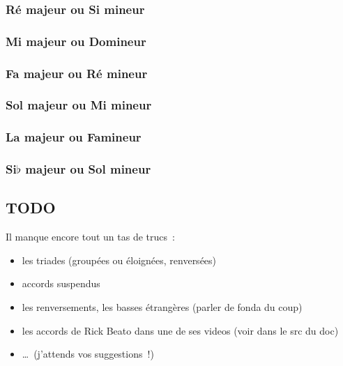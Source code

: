 \documentclass[11pt]{article}
\begin{document}
\subsubsection{Ré majeur ou Si mineur}


\subsubsection{Mi majeur ou Do\shrp mineur}


\subsubsection{Fa majeur ou Ré mineur}


\subsubsection{Sol majeur ou Mi mineur}


\subsubsection{La majeur ou Fa\shrp mineur}


\subsubsection{Si$\flat$ majeur ou Sol mineur}


\subsection{TODO}


Il manque encore tout un tas de trucs~:

\begin{itemize}
\item les triades (groupées ou éloignées, renversées)
\item accords suspendus
\item les renversements, les basses étrangères (parler de fonda du coup)
\item les accords de Rick Beato dans une de ses videos (voir dans le src du doc)
\item \ldots~(j’attends vos suggestions~!)
\end{itemize}
\end{document}
